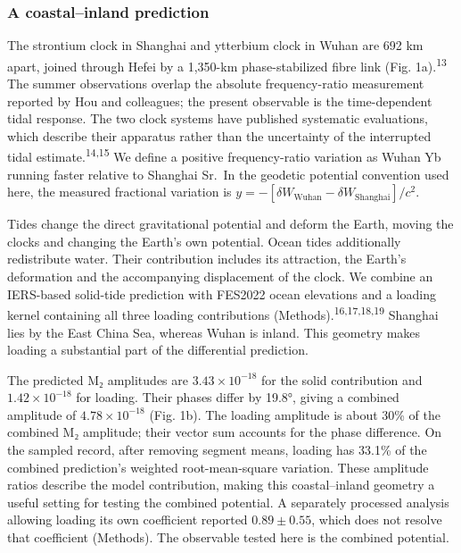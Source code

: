 \documentclass[
  10pt,
  a4paper,
]{article}
\begin{document}
\hypertarget{a-coastalinland-prediction}{%
\subsubsection{A coastal--inland
prediction}\label{a-coastalinland-prediction}}

The strontium clock in Shanghai and ytterbium clock in Wuhan are 692 km
apart, joined through Hefei by a 1,350-km phase-stabilized fibre link
(Fig. 1a).\textsuperscript{13} The summer observations overlap the
absolute frequency-ratio measurement reported by Hou and colleagues; the
present observable is the time-dependent tidal response. The two clock
systems have published systematic evaluations, which describe their
apparatus rather than the uncertainty of the interrupted tidal
estimate.\textsuperscript{14,15} We define a positive frequency-ratio
variation as Wuhan Yb running faster relative to Shanghai Sr.~In the
geodetic potential convention used here, the measured fractional
variation is
\(y=-[\delta W_{\mathrm{Wuhan}}-\delta W_{\mathrm{Shanghai}}]/c^2\).

Tides change the direct gravitational potential and deform the Earth,
moving the clocks and changing the Earth's own potential. Ocean tides
additionally redistribute water. Their contribution includes its
attraction, the Earth's deformation and the accompanying displacement of
the clock. We combine an IERS-based solid-tide prediction with FES2022
ocean elevations and a loading kernel containing all three loading
contributions (Methods).\textsuperscript{16,17,18,19} Shanghai lies by
the East China Sea, whereas Wuhan is inland. This geometry makes loading
a substantial part of the differential prediction.

The predicted M₂ amplitudes are \(3.43\times10^{-18}\) for the solid
contribution and \(1.42\times10^{-18}\) for loading. Their phases differ
by 19.8°, giving a combined amplitude of \(4.78\times10^{-18}\) (Fig.
1b). The loading amplitude is about 30\% of the combined M₂ amplitude;
their vector sum accounts for the phase difference. On the sampled
record, after removing segment means, loading has 33.1\% of the combined
prediction's weighted root-mean-square variation. These amplitude ratios
describe the model contribution, making this coastal--inland geometry a
useful setting for testing the combined potential. A separately
processed analysis allowing loading its own coefficient reported
\(0.89\pm0.55\), which does not resolve that coefficient (Methods). The
observable tested here is the combined potential.
\end{document}
